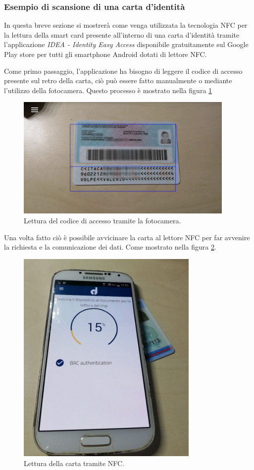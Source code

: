 \subsubsection{Esempio di scansione di una carta d'identità}
In questa breve sezione si mostrerà come venga utilizzata la tecnologia NFC per la lettura della smart card presente all'interno di una carta d'identità tramite l'applicazione \textit{IDEA - Identity Easy Access} disponibile gratuitamente sul Google Play store per tutti gli smartphone Android dotati di lettore NFC.

Come primo passaggio, l'applicazione ha bisogno di leggere il codice di accesso presente sul retro della carta, ciò può essere fatto manualmente o mediante l'utilizzo della fotocamera. Questo processo è mostrato nella figura \ref{fig:leggi_codice}

\begin{figure}[h!]
  \centering
  \includegraphics[width=300pt]{pictures/foto_carta.png}
  \caption{Lettura del codice di accesso tramite la fotocamera.}
  \label{fig:leggi_codice}
\end{figure}

Una volta fatto ciò è possibile avvicinare la carta al lettore NFC per far avvenire la richiesta e la comunicazione dei dati. Come mostrato nella figura \ref{fig:leggi_carta}.

\begin{figure}[h!]
  \centering
  \includegraphics[width=250pt]{pictures/lettura_carta.jpg}
  \caption{Lettura della carta tramite NFC.}
  \label{fig:leggi_carta}
\end{figure}

